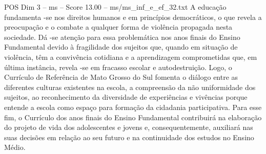 \begin{textsample}{POS Dim 3 – ms – Score 13.00 – ms/ms\_inf\_e\_ef\_32.txt}
A educação fundamenta -se nos direitos humanos e em princípios democráticos, o que revela a preocupação e o combate a qualquer forma de violência propagada nesta sociedade.
Dá -se atenção para essa problemática nos anos finais do Ensino Fundamental devido à fragilidade dos sujeitos que, quando em situação de violência, têm a convivência cotidiana e a aprendizagem comprometidas que, em última instância, revela -se em fracasso escolar e autodestruição.
Logo, o Currículo de Referência de Mato Grosso do Sul fomenta o diálogo entre as diferentes culturas existentes na escola, a compreensão da não uniformidade dos sujeitos, ao reconhecimento da diversidade de experiências e vivências porque entende a escola como espaço para formação da cidadania participativa.
Para esse fim, o Currículo dos anos finais do Ensino Fundamental contribuirá na elaboração do projeto de vida dos adolescentes e jovens e, consequentemente, auxiliará nas suas decisões em relação ao seu futuro e na continuidade dos estudos no Ensino Médio.

\end{textsample}
